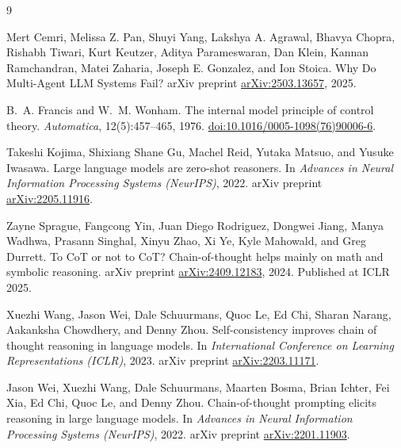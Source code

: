 \documentclass[11pt]{article}
\begin{document}

\begin{thebibliography}{9}

Mert Cemri, Melissa Z. Pan, Shuyi Yang, Lakshya A. Agrawal, Bhavya
Chopra, Rishabh Tiwari, Kurt Keutzer, Aditya Parameswaran, Dan Klein,
Kannan Ramchandran, Matei Zaharia, Joseph E. Gonzalez, and Ion Stoica.
\newblock Why Do Multi-Agent {LLM} Systems Fail?
\newblock arXiv preprint
\href{https://arxiv.org/abs/2503.13657}{arXiv:2503.13657}, 2025.

B.~A. Francis and W.~M. Wonham.
\newblock The internal model principle of control theory.
\newblock \emph{Automatica}, 12(5):457--465, 1976.
\newblock \href{https://doi.org/10.1016/0005-1098(76)90006-6}%
  {doi:10.1016/0005-1098(76)90006-6}.

Takeshi Kojima, Shixiang Shane Gu, Machel Reid, Yutaka Matsuo, and
Yusuke Iwasawa.
\newblock Large language models are zero-shot reasoners.
\newblock In \emph{Advances in Neural Information Processing Systems
(NeurIPS)}, 2022.
\newblock arXiv preprint
\href{https://arxiv.org/abs/2205.11916}{arXiv:2205.11916}.

Zayne Sprague, Fangcong Yin, Juan Diego Rodriguez, Dongwei Jiang, Manya
Wadhwa, Prasann Singhal, Xinyu Zhao, Xi Ye, Kyle Mahowald, and Greg
Durrett.
\newblock To {CoT} or not to {CoT}? Chain-of-thought helps mainly on
math and symbolic reasoning.
\newblock arXiv preprint
\href{https://arxiv.org/abs/2409.12183}{arXiv:2409.12183}, 2024.
\newblock Published at ICLR 2025.

Xuezhi Wang, Jason Wei, Dale Schuurmans, Quoc Le, Ed Chi, Sharan
Narang, Aakanksha Chowdhery, and Denny Zhou.
\newblock Self-consistency improves chain of thought reasoning in
language models.
\newblock In \emph{International Conference on Learning Representations
(ICLR)}, 2023.
\newblock arXiv preprint
\href{https://arxiv.org/abs/2203.11171}{arXiv:2203.11171}.

Jason Wei, Xuezhi Wang, Dale Schuurmans, Maarten Bosma, Brian Ichter,
Fei Xia, Ed Chi, Quoc Le, and Denny Zhou.
\newblock Chain-of-thought prompting elicits reasoning in large
language models.
\newblock In \emph{Advances in Neural Information Processing Systems
(NeurIPS)}, 2022.
\newblock arXiv preprint
\href{https://arxiv.org/abs/2201.11903}{arXiv:2201.11903}.

\end{thebibliography}
\end{document}
